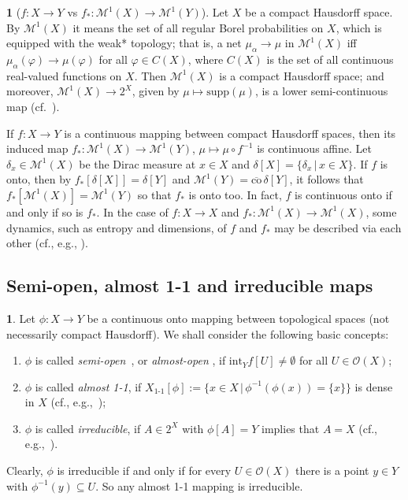 \documentclass[12pt,final,3p,times]{elsarticle}
\theoremstyle{definition}
\newtheorem{sse}[sthm]{}
\numberwithin{equation}{section}
\begin{document}
\begin{sse}[$f\colon X\rightarrow Y$ vs $f_*\colon \mathcal{M}^1(X)\rightarrow\mathcal{M}^1(Y)$]
Let $X$ be a compact Hausdorff space. By $\mathcal{M}^1(X)$ it means the set of all regular Borel probabilities on $X$, which is equipped with the weak* topology; that is, a net $\mu_\alpha\to\mu$ in $\mathcal{M}^1(X)$ iff $\mu_\alpha(\varphi)\to\mu(\varphi)$ for all $\varphi\in C(X)$, where $C(X)$ is the set of all continuous real-valued functions on $X$.
Then $\mathcal{M}^1(X)$ is a compact Hausdorff space; and moreover, $\mathcal{M}^1(X)\rightarrow2^X$, given by $\mu\mapsto\textrm{supp}(\mu)$, is a lower semi-continuous map (cf.~\cite[Lem.~VII.1.4]{Wo}). 

If $f\colon X\rightarrow Y$ is a continuous mapping between compact Hausdorff spaces, then its induced map $f_*\colon\mathcal{M}^1(X)\rightarrow\mathcal{M}^1(Y)$, ${\mu\mapsto \mu\circ f^{-1}}$ is continuous affine.
Let $\delta_x\in\mathcal{M}^1(X)$ be the Dirac measure at $x\in X$ and
$\delta[X]=\{\delta_x\,|\,x\in X\}$. If $f$ is onto, then by $f_*[\delta[X]]=\delta[Y]$ and $\mathcal{M}^1(Y)=\overline{\mathrm{co}}\,\delta[Y]$, it follows that $f_*[\mathcal{M}^1(X)]=\mathcal{M}^1(Y)$ so that $f_*$ is onto too. In fact, $f$ is continuous onto if and only if so is $f_*$.
In the case of $f\colon X\rightarrow X$ and $f_*\colon \mathcal{M}^1(X)\rightarrow \mathcal{M}^1(X)$, some dynamics, such as entropy and dimensions, of $f$ and $f_*$ may be described via each other (cf., e.g., \cite{BS75, GW95, BS25, SZ25, LL}).
\end{sse}

\subsection{Semi-open, almost 1-1 and irreducible maps}\label{s1.2}
\begin{sse}\label{1.2.1}
Let $\phi\colon X\rightarrow Y$ be a continuous onto mapping between topological spaces (not necessarily compact Hausdorff). We shall consider the following basic concepts: 
\begin{enumerate}[\textbf{a.}]
\item[\textbf{a.}] $\phi$ is called \textit{semi-open}~\cite{V70, B79}, or \textit{almost-open} \cite{Ak}, if $\mathrm{int}_Yf[U]\not=\emptyset$ for all $U\in\mathscr{O}(X)$; 
\item[\textbf{b.}] $\phi$ is called \textit{almost 1-1}, if 
$X_{\textrm{1-1}}[\phi]:=\{x\in X\,|\,\phi^{-1}(\phi(x))=\{x\}\}$ is dense in $X$ (cf., e.g.,~\cite{V70,A88});
\item[\textbf{c.}] $\phi$ is called \textit{irreducible}, if $A\in2^X$ with $\phi[A]=Y$ implies that $A=X$ (cf., e.g.,~\cite{E89, Wo, DeV}).
\end{enumerate}
Clearly, $\phi$ is irreducible if and only if for every $U\in\mathscr{O}(X)$ there is a point $y\in Y$ with $\phi^{-1}(y)\subseteq U$. So any almost 1-1 mapping is irreducible.
\end{sse}
\end{document}
